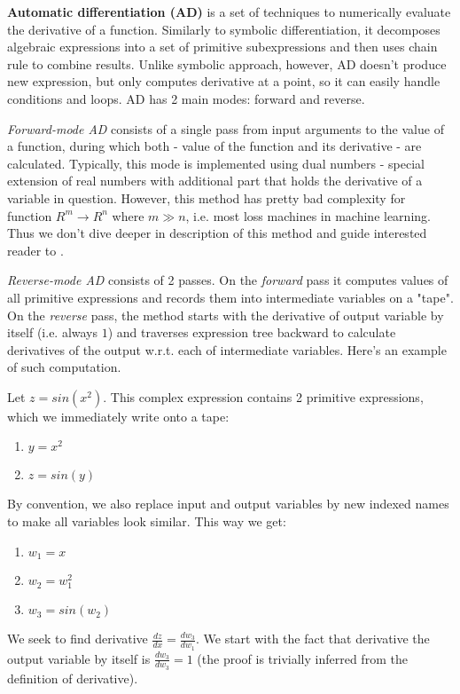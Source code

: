 \documentclass[conference]{IEEEtran}
\begin{document}
\textbf{Automatic differentiation (AD)} is a set of techniques to
numerically evaluate the derivative of a function. Similarly to
symbolic differentiation, it decomposes algebraic expressions into a
set of primitive subexpressions and then uses chain rule to combine
results. Unlike symbolic approach, however, AD doesn't produce new
expression, but only computes derivative at a point, so it can easily
handle conditions and loops. AD has 2 main modes: forward and reverse.

\textit{Forward-mode AD} consists of a single pass from input
arguments to the value of a function, during which both - value of the
function and its derivative - are calculated. Typically, this mode is
implemented using dual numbers - special extension of real numbers
with additional part that holds the derivative of a variable in
question. However, this method has pretty bad complexity for function
$R^m \to R^n$ where $m \gg n$, i.e. most loss machines in machine
learning. Thus we don't dive deeper in description of this method and
guide interested reader to \cite{stan}.

\textit{Reverse-mode AD} consists of 2 passes. On the \textit{forward}
pass it computes values of all primitive expressions and records them
into intermediate variables on a "tape". On the \textit{reverse} pass,
the method starts with the derivative of output variable by itself
(i.e. always $1$) and traverses expression tree backward to calculate
derivatives of the output w.r.t. each of intermediate
variables. Here's an example of such computation.

Let $z = sin(x^2)$. This complex expression contains 2 primitive
expressions, which we immediately write onto a tape:

\begin{enumerate}
\item $y = x^2$
\item $z = sin(y)$
\end{enumerate}

By convention, we also replace input and output variables by new
indexed names to make all variables look similar. This way we get:

\begin{enumerate}
\item $w_1 = x$
\item $w_2 = w_1^2$
\item $w_3 = sin(w_2)$
\end{enumerate}

We seek to find derivative $\frac{dz}{dx} = \frac{dw_3}{dw_1}$. We
start with the fact that derivative the output variable by itself is
$\frac{dw_3}{dw_3} = 1$ (the proof is trivially inferred from the
definition of derivative).
\end{document}
